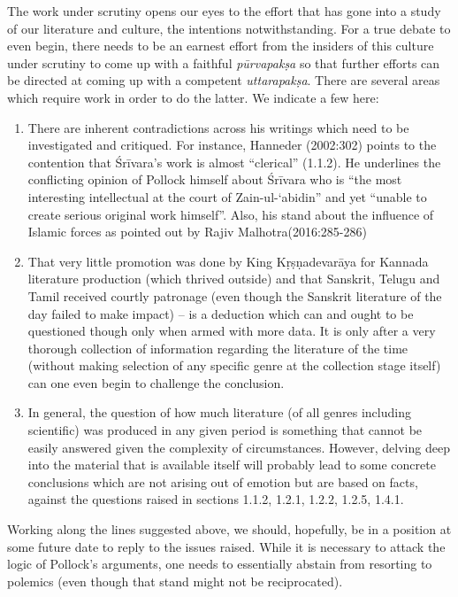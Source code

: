 The work under scrutiny opens our eyes to the effort that has gone into a study of our literature and culture, the intentions notwithstanding. For a true debate to even begin, there needs to be an earnest effort from the insiders of this culture under scrutiny to come up with a faithful {\sl pūrvapakṣa} so that further efforts can be directed at coming up with a competent {\sl uttarapakṣa}. There are several areas which require work in order to do the latter. We indicate a few here:
\renewcommand\theenumi{\alph{enumi}}
\renewcommand\labelenumi{(\theenumi)}
\begin{enumerate}
\item There are inherent contradictions across his writings which need to be investigated and critiqued. For instance, Hanneder (2002:302) points to the contention that Śrīvara’s work is almost “clerical” (1.1.2). He underlines the conflicting opinion of Pollock himself about Śrīvara who is “the most interesting intellectual at the court of Zain-ul-‘abidin” and yet “unable to create serious original work himself”. Also, his stand about the influence of Islamic forces as pointed out by Rajiv Malhotra(2016:285-286)
\item That very little promotion was done by King Kṛṣṇadevarāya for Kannada literature production (which thrived outside) and that Sanskrit, Telugu and Tamil received courtly patronage (even though the Sanskrit literature of the day failed to make impact) – is a deduction which can and ought to be questioned though only when armed with more data. It is only after a very thorough collection of information regarding the literature of the time (without making selection of any specific genre at the collection stage itself) can one even begin to challenge the conclusion.
\item In general, the question of how much literature (of all genres including scientific) was produced in any given period is something that cannot be easily answered given the complexity of circumstances. However, delving deep into the material that is available itself will probably lead to some concrete conclusions which are not arising out of emotion but are based on facts, against the questions raised in sections 1.1.2, 1.2.1, 1.2.2, 1.2.5,  1.4.1.
\end{enumerate}

Working along the lines suggested above, we should, hopefully, be in a position at some future date to reply to the issues raised. While it is necessary to attack the logic of Pollock’s arguments, one needs to essentially abstain from resorting to polemics (even though that stand might not be reciprocated). 

